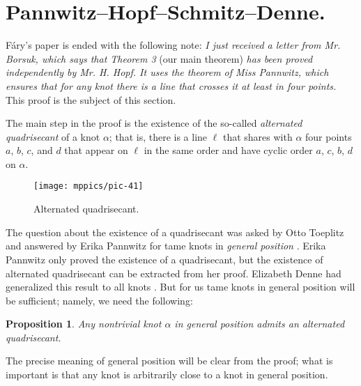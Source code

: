 \documentclass{article}
\theoremstyle{theorem}
\newtheorem{Proposition}[theorem]{Proposition}
\newtheorem{Crofton-type formula}[theorem]{Crofton-type formula}
\newtheorem{Douglas--Rado theorem}[theorem]{Douglas--Rado theorem}
\newtheorem{Extended monotonicity theorem}[theorem]{Extended monotonicity theorem}
\theoremstyle{definition}
\begin{document}
\section{Pannwitz--Hopf--Schmitz--Denne.}\label{sec:quadrisecant}

Fáry's paper \cite{fary} is ended with the following note:
\textit{I just received a letter from Mr. Borsuk, which says that Theorem 3} (our main theorem) \textit{has been proved independently by Mr. H. Hopf.
It uses the theorem of Miss Pannwitz, which ensures that for any knot there is a line that crosses it at least in four
points.}
This proof is the subject of this section.

The main step in the proof is the existence of the so-called \emph{alternated quadrisecant} of a knot $\alpha$; that is, there is a line $\ell$ that shares with $\alpha$ four points $a$, $b$, $c$, and $d$
that appear on $\ell$ in the same order and have cyclic order $a$, $c$, $b$, $d$ on $\alpha$.

\begin{figure}[!ht]
\vskip-0mm
\centering
\texttt{[image: mppics/pic-41]}
\caption{Alternated quadrisecant.}
\vskip0mm
\end{figure}

The question about the existence of a quadrisecant was asked by Otto Toep\-litz and answered by Erika Pannwitz for tame knots in \emph{general position} \cite{pannwitz}.
Erika Pannwitz only proved the existence of a quadrisecant, but the existence of alternated quadrisecant can be extracted from her proof.
Elizabeth Denne had generalized this result to all knots \cite{denne, denne-survey}.
But for us tame knots in general position will be sufficient;
namely, we need the following:


\begin{Proposition}\label{prop:quadrisecant}
Any nontrivial knot $\alpha$ in general position admits an \emph{alternated quadrisecant}.
\end{Proposition}

The precise meaning of general position will be clear from the proof;
what is important is that any knot is arbitrarily close to a knot in general position.
\end{document}
